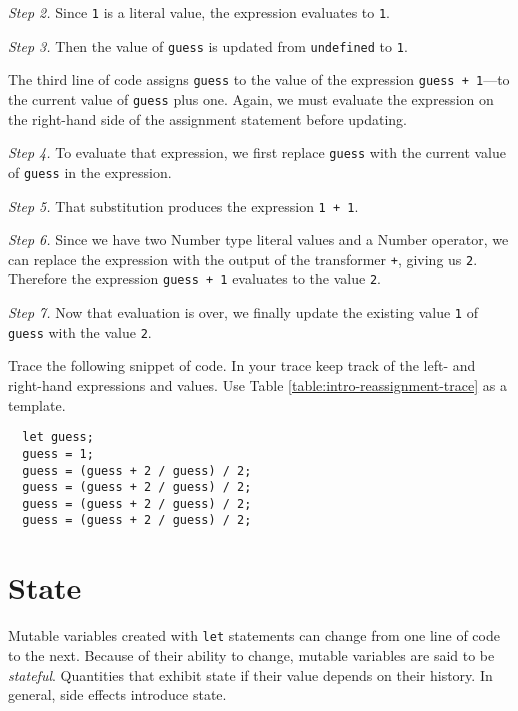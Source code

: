 \textit{Step 2.} Since \texttt{1} is a literal value, the expression evaluates to \texttt{1}.

\textit{Step 3.} Then the value of \texttt{guess} is updated from \texttt{undefined} to \texttt{1}.

The third line of code assigns \texttt{guess} to the value of the expression \texttt{guess~+~1}---to the current value of \texttt{guess} plus one. Again, we must evaluate the expression on the right-hand side of the assignment statement before updating.

\textit{Step 4.} To evaluate that expression, we first replace \texttt{guess} with the current value of \texttt{guess} in the expression.

\textit{Step 5.} That substitution produces the expression \texttt{1 + 1}.

\textit{Step 6.} Since we have two \textsf{Number} type literal values and a \textsf{Number} operator, we can replace the expression with the output of the transformer \texttt{+}, giving us \texttt{2}. Therefore the expression \texttt{guess~+~1} evaluates to the value \texttt{2}.

\textit{Step 7.} Now that evaluation is over, we finally update the existing value \texttt{1} of \texttt{guess} with the value \texttt{2}.

\begin{question}
  Trace the following snippet of code. In your trace keep track of the left- and right-hand expressions and values. Use Table \ref{table:intro-reassignment-trace} as a template.

  \begin{lstlisting}
  let guess;
  guess = 1;
  guess = (guess + 2 / guess) / 2;
  guess = (guess + 2 / guess) / 2;
  guess = (guess + 2 / guess) / 2;
  guess = (guess + 2 / guess) / 2;
  \end{lstlisting}
\end{question}

\section{State}
Mutable variables created with \texttt{let} statements can change from one line of code to the next. Because of their ability to change, mutable variables are said to be \emph{stateful}. Quantities that exhibit state if their value depends on their history.  In general, side effects introduce state.

